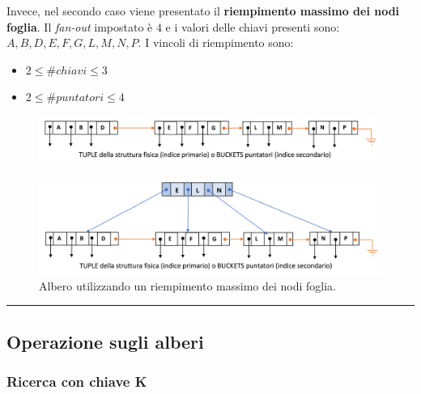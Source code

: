 \documentclass[a4paper]{article}
\newcommand{\longline}{\noindent\rule{\textwidth}{0.4pt}}
\begin{document}
	\noindent
	Invece, nel secondo caso viene presentato il \textcolor{Green4}{\textbf{riempimento massimo dei nodi foglia}}. Il \emph{fan-out} impostato è $4$ e i valori delle chiavi presenti sono: $A,B,D,E,F,G,L,M,N,P$. I vincoli di riempimento sono:
	\begin{itemize}
		\item $2 \le \#chiavi \le 3$
		\item $2 \le \#puntatori \le 4$
	\end{itemize}
	\begin{figure}[!htp]
		\centering
		\includegraphics[width=\textwidth]{img/esempio_riempimento_massimo.png}
	\end{figure}\newpage
	\begin{figure}[!htp]
		\centering
		\includegraphics[width=\textwidth]{img/esempio_riempimento_massimo-albero.png}
		\caption{Albero utilizzando un riempimento massimo dei nodi foglia.}
	\end{figure}

	\longline
	
	\subsection{Operazione sugli alberi}
	
	\subsubsection{Ricerca con chiave K}
	
\end{document}
